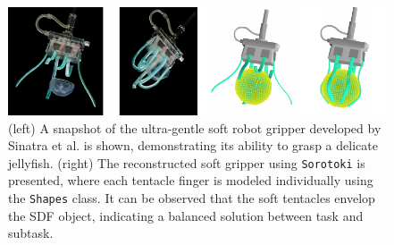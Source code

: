 \begin{figure}[!t]
\centering
\includegraphics*[width=.99\textwidth]{./pdf/thesis-figure-6-13.pdf}
%
\caption{\small (left) A snapshot of the ultra-gentle soft robot gripper developed by Sinatra et al. \cite{Sinatra2019Aug} is shown, demonstrating its ability to grasp a delicate jellyfish. (right) The reconstructed soft gripper using \texttt{Sorotoki} is presented, where each tentacle finger is modeled individually using the \texttt{Shapes} class. It can be observed that the soft tentacles envelop the SDF object, indicating a balanced solution between task and subtask.}
\label{fig:C5:shapesexample}
\vspace{-5mm}
\end{figure}

